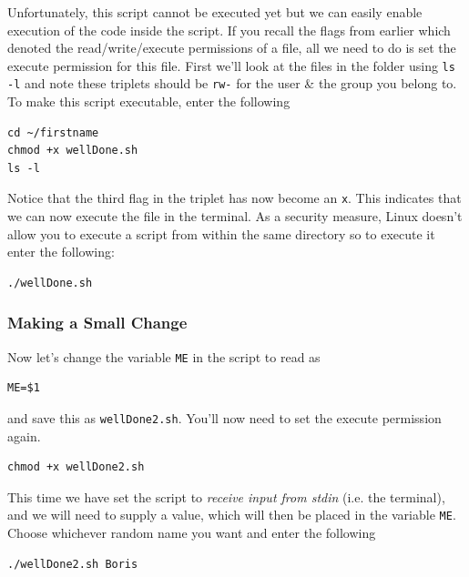 \documentclass[a4paper,12pt,twoside]{memoir}
\begin{document}
\begin{steps}
Unfortunately, this script cannot be executed yet but we can easily enable execution of the code inside the script.
If you recall the flags from earlier which denoted the read/write/execute permissions of a file, all we need to do is set the execute permission for this file.
First we'll look at the files in the folder using \texttt{ls -l} and note these triplets should be \texttt{rw-} for the user \& the group you belong to.
To make this script executable, enter the following
\begin{lstlisting}
cd ~/firstname
chmod +x wellDone.sh
ls -l
\end{lstlisting}
\end{steps}

\begin{steps}
Notice that the third flag in the triplet has now become an \texttt{x}.
This indicates that we can now execute the file in the terminal.
As a security measure, Linux doesn't allow you to execute a script from within the same directory so to execute it enter the following:
\begin{lstlisting}
./wellDone.sh
\end{lstlisting}
\end{steps}

\subsubsection{Making a Small Change}

\begin{steps}
Now let's change the variable \texttt{ME} in the script to read as
\begin{lstlisting}
ME=$1
\end{lstlisting}
and save this as \texttt{wellDone2.sh}.
You'll now need to set the execute permission again.
\begin{lstlisting}
chmod +x wellDone2.sh
\end{lstlisting}
\end{steps}

\begin{information}
This time we have set the script to \textit{receive input from stdin} (i.e. the terminal), and we will need to supply a value, which will then be placed in the variable \texttt{ME}.
Choose whichever random name you want and enter the following
\begin{lstlisting}
./wellDone2.sh Boris
\end{lstlisting}
\end{information}
\end{document}

